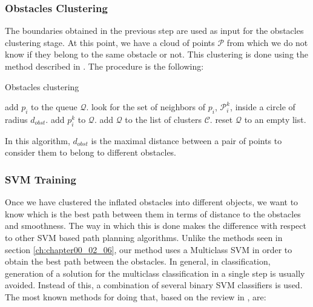 \subsubsection{Obstacles Clustering}\label{ch:chapter06_01_01_02}

The boundaries obtained in the previous step are used as input for the obstacles clustering stage. At this point, we have a cloud of points $\mathcal{P}$ from which we do not know if they belong to the same obstacle or not. This clustering is done using the method described in \cite{rusu2009semantic}. The procedure is the following:

\begin{algorithm}
\caption{Obstacles clustering}
\label{alg:obstacles_clustering}
\begin{algorithmic}
  \State add $p_i$ to the queue $\mathcal{Q}$.
    \State look for the set of neighbors of $p_i$, $\mathcal{P}_i^k$, inside a circle of radius $d_{obst}$.
	\State add $p_i^k$ to $\mathcal{Q}$.
      \EndIf
    \EndFor
      \State add $\mathcal{Q}$ to the list of clusters $\mathcal{C}$.
      \State reset $\mathcal{Q}$ to an empty list.
    \EndIf
  \EndFor
\EndFor
\end{algorithmic}
\end{algorithm}

In this algorithm, $d_{obst}$ is the maximal distance between a pair of points to consider them to belong to different obstacles.

\subsubsection{\ac{SVM} Training}\label{ch:chapter06_01_01_03}

Once we have clustered the inflated obstacles into different objects, we want to know which is the best path between them in terms of distance to the obstacles and smoothness. The way in which this is done makes the difference with respect to other \ac{SVM} based path planning algorithms. Unlike the methods seen in section \ref{ch:chapter00_02_06}, our method uses a Multiclass \acs{SVM} in order to obtain the best path between the obstacles. In general, in classification, generation of a solution for the multiclass classification in a single step is usually avoided. Instead of this, a combination of several binary \ac{SVM} classifiers is used. The most known methods for doing that, based on the review in \cite{hsu2002comparison, duan2005best}, are:

